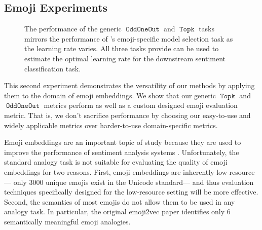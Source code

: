 \documentclass[11pt,a4paper]{article}
\DeclareMathOperator{\OddOneOut}{\texttt{OddOneOut}}
\DeclareMathOperator{\topk}{\texttt{Topk}}
\begin{document}
\subsection{Emoji Experiments}
\begin{figure}
\centering
\caption{
    The performance of the generic $\OddOneOut$ and $\topk$ tasks mirrors the performance of \citet{eisner2016emoji2vec}'s emoji-specific model selection task as the learning rate varies.
    All three tasks provide can be used to estimate the optimal learning rate for the downstream sentiment classification task.
}
\label{fig:emoji}
\end{figure}

This second experiment demonstrates the versatility of our methods by applying them to the domain of emoji embeddings.
We show that our generic $\topk$ and $\OddOneOut$ metrics perform as well as a custom designed emoji evaluation metric.
That is, we don't sacrifice performance by choosing our easy-to-use and widely applicable metrics over harder-to-use domain-specific metrics.

Emoji embeddings are an important topic of study because they are used to improve the performance of sentiment analysis systems \cite[e.g.][]{eisner2016emoji2vec,felbo2017using,barbieri2017emojis,ai2017untangling,wijeratne2017semantics,al2019smile}. 
Unfortunately,
the standard analogy task is not suitable for evaluating the quality of emoji embeddings for two reasons.
First, emoji embeddings are inherently low-resource---%
only 3000 unique emojis exist in the Unicode standard---%
and thus evaluation techniques specifically designed for the low-resource setting will be more effective.
Second, the semantics of most emojis do not allow them to be used in any analogy task.
In particular, the original emoji2vec paper \cite{eisner2016emoji2vec} identifies only 6 semantically meaningful emoji analogies.
\end{document}
